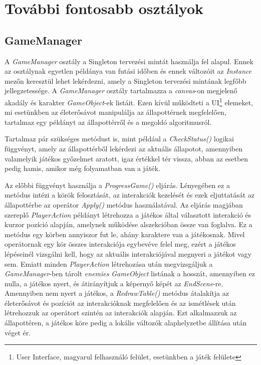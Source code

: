 \documentclass[
]{thesis-ekf}
\theoremstyle{definition}
\theoremstyle{remark}
\begin{document}
\section{További fontosabb osztályok} 

\subsection{GameManager} \label{gamemanager}

A \emph{GameManager} osztály a Singleton tervezési mintát használja fel alapul. Ennek az osztálynak egyetlen példánya van futási időben és ennek változóit az \emph{Instance} mezőn keresztül lehet lekérdezni, amely a Singleton tervezési mintának legfőbb jellegzetessége. A \emph{GameManager} osztály tartalmazza a \emph{canvas}-on megjelenő akadály és karakter \emph{GameObject}-ek listáit. Ezen kívül működteti a UI\footnote{User Interface, magyarul felhasználó felület, esetünkben a játék felülete} elemeket, mi esetünkben az életerősávot manipulálja az állapottérnek megfelelően, tartalmaz egy példányt az állapottérről és a megoldó algoritmusról.

Tartalmaz pár szükséges metódust is, mint például a \emph{CheckStatus()} logikai függvényt, amely az állapottérből lekérdezi az aktuális állapotot, amennyiben valamelyik játékos győzelmet aratott, igaz értékkel tér vissza, abban az esetben pedig hamis, amikor még folyamatban van a játék. 

Az előbbi függvényt használja a \emph{ProgressGame()} eljárás. Lényegében ez a metódus intézi a körök felosztását, az interakciók kezelését és ezek eljuttatását az állapottérbe az operátor \emph{Apply()} metódus használatával. Az eljárás magjában szereplő \emph{PlayerAction} példányt létrehozza a játékos által választott interakció és kurzor pozíció alapján, amelynek működése  alszekcióban össze van foglalva. Ez a metódus egy körben annyiszor fut le, ahány karaktere van a játékosnak. Mivel operátornak egy kör összes interakciója egybevéve felel meg, ezért a játékos lépéseinél vizsgálni kell, hogy az aktuális interakciójával megnyeri a játékot vagy sem. Emiatt minden \emph{PlayerAction} létrehozása után megvizsgáljuk a \emph{GameManager}-ben tárolt \emph{enemies} \emph{GameObject} listának a hosszát, amennyiben ez nulla, a játékos nyert, és átirányítjuk a képernyő képét az \emph{EndScene}-re. Amennyiben nem nyert a játékos, a \emph{RedrawTable()} metódus átalakítja az életerősávot és pozíciót az interakcióknak megfelelően és az ismétlések után létrehozzuk az operátort szintén az interakciók alapján. Ezt alkalmazzuk az állapottéren, a játékos köre pedig a lokális változók alaphelyzetbe állítása után véget ér. 
\end{document}
